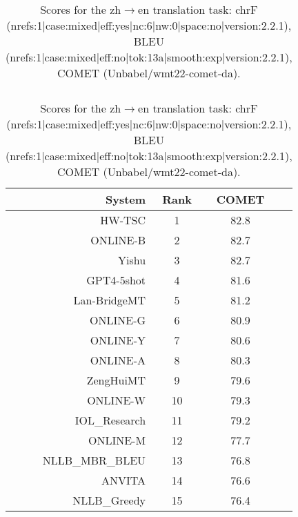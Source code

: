\documentclass[11pt]{article}
\begin{document}
\begin{table}
\begin{subtable}[t]{0.33\textwidth}
\begin{tabular}{rccc}
\bottomrule 
\end{tabular} 
\end{subtable} 
\begin{subtable}[t]{0.33\textwidth}
\begin{tabular}{rccc}
\toprule 
System & Rank & COMET \\ 
\midrule 
HW-TSC & 1 & 82.8 \\ 
ONLINE-B & 2 & 82.7 \\ 
Yishu & 3 & 82.7 \\ 
GPT4-5shot & 4 & 81.6 \\ 
Lan-BridgeMT & 5 & 81.2 \\ 
ONLINE-G & 6 & 80.9 \\ 
ONLINE-Y & 7 & 80.6 \\ 
ONLINE-A & 8 & 80.3 \\ 
ZengHuiMT & 9 & 79.6 \\ 
ONLINE-W & 10 & 79.3 \\ 
IOL\_Research & 11 & 79.2 \\ 
ONLINE-M & 12 & 77.7 \\ 
NLLB\_MBR\_BLEU & 13 & 76.8 \\ 
ANVITA & 14 & 76.6 \\ 
NLLB\_Greedy & 15 & 76.4 \\ 
\bottomrule 
\end{tabular} 
\end{subtable} 
\caption{Scores for the zh$\rightarrow$en translation task: chrF (nrefs:1|case:mixed|eff:yes|nc:6|nw:0|space:no|version:2.2.1), BLEU (nrefs:1|case:mixed|eff:no|tok:13a|smooth:exp|version:2.2.1), COMET (Unbabel/wmt22-comet-da).} 
\end{table} 
\end{document}
